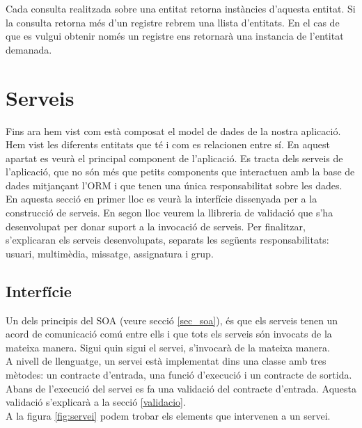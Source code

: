 	Cada consulta realitzada sobre una entitat retorna instàncies d'aquesta entitat. Si la consulta retorna més d'un registre rebrem una llista d'entitats. En el cas de que es vulgui obtenir només un registre ens retornarà una instancia de l'entitat demanada.

  
\section{Serveis}
	Fins ara hem vist com està composat el model de dades de la nostra aplicació. Hem vist les diferents entitats que té i com es relacionen entre sí. En aquest apartat es veurà el principal component de l'aplicació. Es tracta dels serveis de l'aplicació, que no són més que petits components que interactuen amb la base de dades mitjançant l'\ac{ORM} i que tenen una única responsabilitat sobre les dades. \\
	
	En aquesta secció en primer lloc es veurà la interfície dissenyada per a la construcció de serveis. En segon lloc veurem la llibreria de validació que s'ha desenvolupat per donar suport a la invocació de serveis. Per finalitzar, s'explicaran els serveis desenvolupats, separats les següents responsabilitats: usuari, multimèdia, missatge, assignatura i grup.
	
	\subsection{Interfície}
	
	Un dels principis del \ac{SOA} (veure secció \ref{sec_soa}), és que els serveis tenen un acord de comunicació comú entre ells i que tots els serveis són invocats de la mateixa manera. Sigui quin sigui el servei, s'invocarà de la mateixa manera.\\
	
	A nivell de llenguatge, un servei està implementat dins una classe amb tres mètodes: un contracte d'entrada, una funció d'execució i un contracte de sortida. Abans de l'execució del servei es fa una validació del contracte d'entrada. Aquesta validació s'explicarà a la secció \ref{validacio}.\\
	
	 A la figura \ref{fig:servei} podem trobar els elements que intervenen a un servei.\\
	

